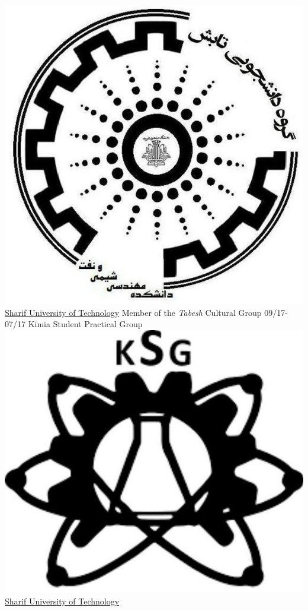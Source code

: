 \documentclass[a4paper]{friggeri-cv}
\begin{document}
\begin{entrylist}
        {\href{http://www.sharif.ir}{\includegraphics[scale=0.03]{../assets/images/Tabesh_logo.jpg} Sharif University of Technology}}
        {Member of the \emph{Tabesh} Cultural Group}
        \entry
        {09/17-07/17}
        {   Kimia Student Practical Group}
        {\href{http://www.sharif.ir/}{\includegraphics[scale=0.03]{../assets/images/Kimia_logo.jpg} Sharif University of Technology}}

\end{entrylist}
\end{document}
